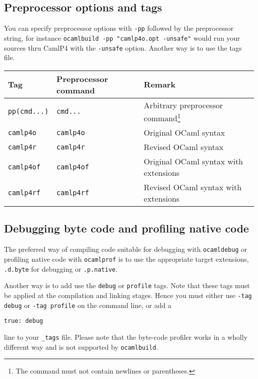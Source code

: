 \documentclass[9pt]{article}
\newcommand{\ocb}{\texttt{ocamlbuild}\xspace}
\begin{document}
\subsection{Preprocessor options and tags}
You can specify preprocessor options with \texttt{-pp} followed by the
preprocessor string, for instance \texttt{ocamlbuild -pp "camlp4o.opt -unsafe"}
would run your sources thru CamlP4 with the \texttt{-unsafe} option.
Another way is to use the tags file.  
\begin{center}
  \begin{tabular}{|l|l|l|}
    \hline
    \textbf{Tag}        & \textbf{Preprocessor command} & \textbf{Remark} \\
    \hline
    \hline
    \texttt{pp(cmd...)} & \texttt{cmd...}               & Arbitrary
        preprocessor command\footnote{The command must not contain newlines or parentheses.} \\
    \hline
    \texttt{camlp4o}    & \texttt{camlp4o}              & Original OCaml syntax \\
    \hline
    \texttt{camlp4r}    & \texttt{camlp4r}              & Revised OCaml syntax \\
    \hline
    \texttt{camlp4of}   & \texttt{camlp4of}             & Original OCaml syntax with extensions \\
    \hline
    \texttt{camlp4rf}   & \texttt{camlp4rf}             & Revised OCaml syntax with extensions \\
    \hline
  \end{tabular}
\end{center}
\subsection{Debugging byte code and profiling native code}
The preferred way of compiling code suitable for debugging with \texttt{ocamldebug} or
profiling native code with \texttt{ocamlprof} is to use the appropriate target
extensions, \texttt{.d.byte} for debugging or \texttt{.p.native}.

Another way is to add use the \texttt{debug} or \texttt{profile} tags.
Note that these tags must be applied at the compilation and linking stages.
Hence you must either use \texttt{-tag debug} or \texttt{-tag profile}
on the command line, or add a
\begin{verbatim}
true: debug
\end{verbatim}
line to your \texttt{\_tags} file.
Please note that the byte-code profiler works in a wholly different way
and is not supported by \ocb.
\end{document}

